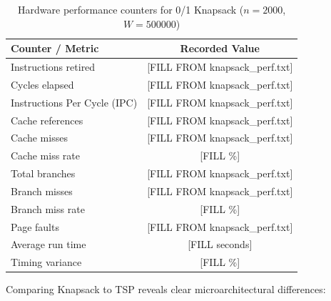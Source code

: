 \documentclass[11pt,a4paper]{article}
\begin{document}
\begin{table}[h!]
\centering
\caption{Hardware performance counters for 0/1 Knapsack ($n=2000$, $W=500000$)}
\label{tab:ks}
\begin{tabular}{lS[table-format=3.3e3]}
\toprule
\textbf{Counter / Metric} & {\textbf{Recorded Value}} \\
\midrule
Instructions retired         & {[FILL FROM knapsack\_perf.txt]} \\
Cycles elapsed               & {[FILL FROM knapsack\_perf.txt]} \\
Instructions Per Cycle (IPC) & {[FILL FROM knapsack\_perf.txt]} \\
Cache references             & {[FILL FROM knapsack\_perf.txt]} \\
Cache misses                 & {[FILL FROM knapsack\_perf.txt]} \\
Cache miss rate              & {[FILL \%]} \\
Total branches               & {[FILL FROM knapsack\_perf.txt]} \\
Branch misses                & {[FILL FROM knapsack\_perf.txt]} \\
Branch miss rate             & {[FILL \%]} \\
Page faults                  & {[FILL FROM knapsack\_perf.txt]} \\
Average run time             & {[FILL seconds]} \\
Timing variance              & {[FILL \%]} \\
\bottomrule
\end{tabular}
\end{table}

Comparing Knapsack to TSP reveals clear microarchitectural differences:
\end{document}
